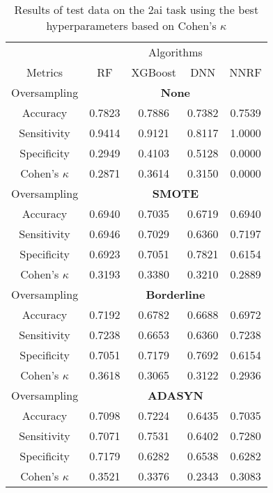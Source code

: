 \begin{table}[!htb]
\centering
\caption{Results of test data on the 2ai task using the best hyperparameters based on Cohen's $\kappa$}
\label{tab:2ai_test_results}
\begin{tabular}{c | c c c c}
\hline
 & \multicolumn{4}{c}{Algorithms}\\ 
Metrics &RF & XGBoost & DNN & NNRF\\ 
\hline
Oversampling &\multicolumn{4}{|c}{\textbf{None}}\\ 
\hline
Accuracy & 0.7823 & 0.7886 & 0.7382 & 0.7539\\ 
Sensitivity & 0.9414 & 0.9121 & 0.8117 & 1.0000\\ 
Specificity & 0.2949 & 0.4103 & 0.5128 & 0.0000\\ 
Cohen's $\kappa$ & 0.2871 & 0.3614 & 0.3150 & 0.0000\\ 
\hline
Oversampling &\multicolumn{4}{|c}{\textbf{SMOTE}}\\ 
\hline
Accuracy & 0.6940 & 0.7035 & 0.6719 & 0.6940\\ 
Sensitivity & 0.6946 & 0.7029 & 0.6360 & 0.7197\\ 
Specificity & 0.6923 & 0.7051 & 0.7821 & 0.6154\\ 
Cohen's $\kappa$ & 0.3193 & 0.3380 & 0.3210 & 0.2889\\ 
\hline
Oversampling &\multicolumn{4}{|c}{\textbf{Borderline}}\\ 
\hline
Accuracy & 0.7192 & 0.6782 & 0.6688 & 0.6972\\ 
Sensitivity & 0.7238 & 0.6653 & 0.6360 & 0.7238\\ 
Specificity & 0.7051 & 0.7179 & 0.7692 & 0.6154\\ 
Cohen's $\kappa$ & 0.3618 & 0.3065 & 0.3122 & 0.2936\\ 
\hline
Oversampling &\multicolumn{4}{|c}{\textbf{ADASYN}}\\ 
\hline
Accuracy & 0.7098 & 0.7224 & 0.6435 & 0.7035\\ 
Sensitivity & 0.7071 & 0.7531 & 0.6402 & 0.7280\\ 
Specificity & 0.7179 & 0.6282 & 0.6538 & 0.6282\\ 
Cohen's $\kappa$ & 0.3521 & 0.3376 & 0.2343 & 0.3083\\ 
\hline
\end{tabular}
\end{table}


